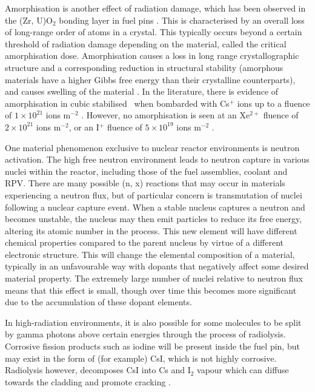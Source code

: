 Amorphisation is another effect of radiation damage, which has been observed in the (Zr, U)O$_{2}$ bonding layer in fuel pins \cite{Nogita1997}. This is characterised by an overall loss of long-range order of atoms in a crystal. This typically occurs beyond a certain threshold of radiation damage depending on the material, called the critical amorphisation dose. Amorphisation causes a loss in long range crystallographic structure and a corresponding reduction in structural stability (amorphous materials have a higher Gibbs free energy than their crystalline counterparts), and causes swelling of the material \cite{Einfal2013}. In the literature, there is evidence of amorphisation in cubic stabilised \zirconia\ when bombarded with Cs$^{+}$ ions up to a fluence of $1 \times 10^{21}$ ions m$^{-2}$ \cite{amorphization2000wang}. However, no amorphisation is seen at an Xe$^{2+}$ fluence of $2 \times 10^{21}$ ions m$^{-2}$, or an I$^{+}$ fluence of $5 \times 10^{19}$ ions m$^{-2}$ \cite{sickafus1999radiation}.

One material phenomenon exclusive to nuclear reactor environments is neutron activation. The high free neutron environment leads to neutron capture in various nuclei within the reactor, including those of the fuel assemblies, coolant and RPV. There are many possible (n, x) reactions that may occur in materials experiencing a neutron flux, but of particular concern is transmutation of nuclei following a nuclear capture event. When a stable nucleus captures a neutron and becomes unstable, the nucleus may then emit particles to reduce its free energy, altering its atomic number in the process. This new element will have different chemical properties compared to the parent nucleus by virtue of a different electronic structure. This will change the elemental composition of a material, typically in an unfavourable way with dopants that negatively affect some desired material property. The extremely large number of nuclei relative to neutron flux means that this effect is small, though over time this becomes more significant due to the accumulation of these dopant elements.

In high-radiation environments, it is also possible for some molecules to be split by gamma photons above certain energies through the process of radiolysis. Corrosive fission products such as iodine will be present inside the fuel pin, but may exist in the form of (for example) CsI, which is not highly corrosive. Radiolysis however, decomposes CsI into Cs and I$_{2}$ vapour which can diffuse towards the cladding and promote cracking \cite{Konashi1983}.

